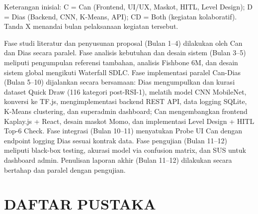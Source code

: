 \documentclass[12pt,a4paper,oneside,openany]{report}
\begin{document}
Keterangan inisial: C = Can (Frontend, UI/UX, Maskot, HITL, Level Design); D = Dias (Backend, CNN, K-Means, API); CD = Both (kegiatan kolaboratif). Tanda X menandai bulan pelaksanaan kegiatan tersebut.

Fase studi literatur dan penyusunan proposal (Bulan 1--4) dilakukan oleh Can dan Dias secara paralel. Fase analisis kebutuhan dan desain sistem (Bulan 3--5) meliputi pengumpulan referensi tambahan, analisis Fishbone 6M, dan desain sistem global mengikuti Waterfall SDLC. Fase implementasi paralel Can-Dias (Bulan 5--10) dijalankan secara bersamaan: Dias mengumpulkan dan kurasi dataset Quick Draw (116 kategori post-RSI-1), melatih model CNN MobileNet, konversi ke TF.js, mengimplementasi backend REST API, data logging SQLite, K-Means clustering, dan superadmin dashboard; Can mengembangkan frontend Kaplay.js + React, desain maskot Momo, dan implementasi Level Design + HITL Top-6 Check. Fase integrasi (Bulan 10--11) menyatukan Probe UI Can dengan endpoint logging Dias sesuai kontrak data. Fase pengujian (Bulan 11--12) meliputi black-box testing, akurasi model via confusion matrix, dan SUS untuk dashboard admin. Penulisan laporan akhir (Bulan 11--12) dilakukan secara bertahap dan paralel dengan pengujian.

%
%
%
%   

\chapter*{DAFTAR PUSTAKA}
\end{document}
